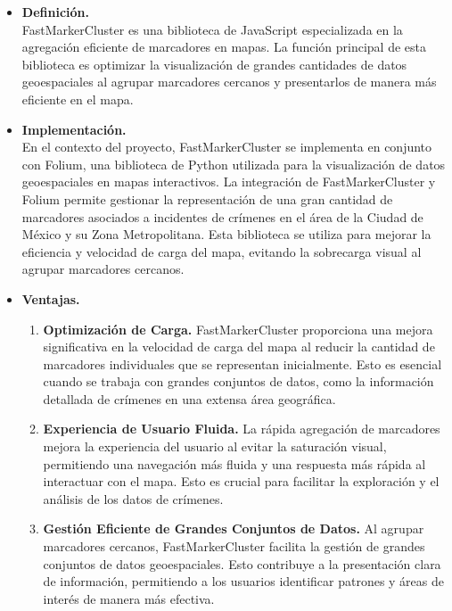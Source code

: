 \documentclass{article}
\begin{document}
            \begin{itemize}
                \item \textbf{Definición.}\\
                FastMarkerCluster es una biblioteca de JavaScript especializada en la agregación eficiente de marcadores en mapas. La función principal de esta biblioteca es optimizar la visualización de grandes cantidades de datos geoespaciales al agrupar marcadores cercanos y presentarlos de manera más eficiente en el mapa.

                \item \textbf{Implementación.}\\
                En el contexto del proyecto, FastMarkerCluster se implementa en conjunto con Folium, una biblioteca de Python utilizada para la visualización de datos geoespaciales en mapas interactivos. La integración de FastMarkerCluster y Folium permite gestionar la representación de una gran cantidad de marcadores asociados a incidentes de crímenes en el área de la Ciudad de México y su Zona Metropolitana. Esta biblioteca se utiliza para mejorar la eficiencia y velocidad de carga del mapa, evitando la sobrecarga visual al agrupar marcadores cercanos.

                \item \textbf{Ventajas.}\\
                \begin{enumerate}
                    \item \textbf{Optimización de Carga.} FastMarkerCluster proporciona una mejora significativa en la velocidad de carga del mapa al reducir la cantidad de marcadores individuales que se representan inicialmente. Esto es esencial cuando se trabaja con grandes conjuntos de datos, como la información detallada de crímenes en una extensa área geográfica.

                    \item \textbf{Experiencia de Usuario Fluida.} La rápida agregación de marcadores mejora la experiencia del usuario al evitar la saturación visual, permitiendo una navegación más fluida y una respuesta más rápida al interactuar con el mapa. Esto es crucial para facilitar la exploración y el análisis de los datos de crímenes.

                    \item \textbf{Gestión Eficiente de Grandes Conjuntos de Datos.} Al agrupar marcadores cercanos, FastMarkerCluster facilita la gestión de grandes conjuntos de datos geoespaciales. Esto contribuye a la presentación clara de información, permitiendo a los usuarios identificar patrones y áreas de interés de manera más efectiva.


\end{enumerate}
\end{itemize}
\end{document}
